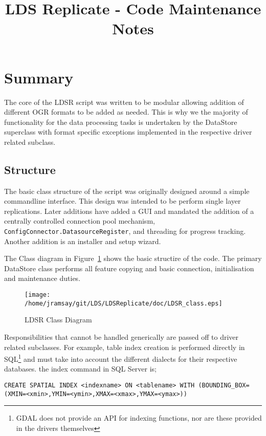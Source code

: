 \documentclass[a4paper]{report}
\title{LDS Replicate - Code Maintenance Notes}
\begin{document}
\maketitle

\section*{Summary} The core of the LDSR script was written to be modular
allowing addition of different OGR formats to be added as needed. This is why we
the majority of functionality for the data processing tasks is undertaken by the
DataStore superclass with format specific exceptions implemented in the
respective driver related subclass.

\subsection*{Structure} The basic class structure of the script was originally
designed around a simple commandline interface. This design was intended to be
perform single layer replications. Later additions have added a GUI and mandated
the addition of a centrally controlled connection pool mechanism,
\lstinline|ConfigConnector.DatasourceRegister|, and threading for progress
tracking. Another addition is an installer and setup wizard.

The Class diagram in Figure~\ref{fig:ClassDiagram} shows the basic structire of
the code. The primary DataStore class performs all feature copying and basic
connection, initialisation and maintenance duties.


\begin{figure}[ht!]
  \centering
  \texttt{[image: /home/jramsay/git/LDS/LDSReplicate/doc/LDSR\_class.eps]}
  \caption{LDSR Class Diagram}
  \label{fig:ClassDiagram}
\end{figure}

Responsibilities that cannot be handled generically are passed off to driver
related subclasses. For example, table index creation is performed directly in
SQL\footnote{GDAL does not provide an API for indexing functions, nor are these
provided in the drivers themselves} and must take into account the different
dialects for their respective databases. the index command in SQL Server is;

\begin{lstlisting}
CREATE SPATIAL INDEX <indexname> ON <tablename> WITH (BOUNDING_BOX=(XMIN=<xmin>,YMIN=<ymin>,XMAX=<xmax>,YMAX=<ymax>))
\end{lstlisting}
\end{document}
